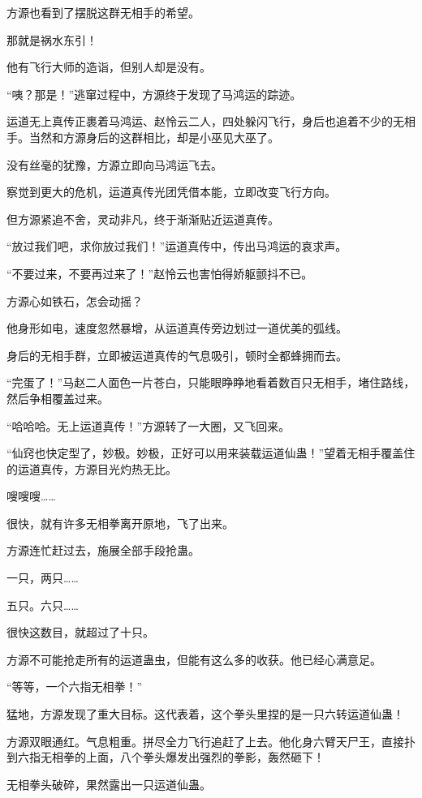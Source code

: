 \begin{this_body}
方源也看到了摆脱这群无相手的希望。

那就是祸水东引！

他有飞行大师的造诣，但别人却是没有。

“咦？那是！”逃窜过程中，方源终于发现了马鸿运的踪迹。

运道无上真传正裹着马鸿运、赵怜云二人，四处躲闪飞行，身后也追着不少的无相手。当然和方源身后的这群相比，却是小巫见大巫了。

没有丝毫的犹豫，方源立即向马鸿运飞去。

察觉到更大的危机，运道真传光团凭借本能，立即改变飞行方向。

但方源紧追不舍，灵动非凡，终于渐渐贴近运道真传。

“放过我们吧，求你放过我们！”运道真传中，传出马鸿运的哀求声。

“不要过来，不要再过来了！”赵怜云也害怕得娇躯颤抖不已。

方源心如铁石，怎会动摇？

他身形如电，速度忽然暴增，从运道真传旁边划过一道优美的弧线。

身后的无相手群，立即被运道真传的气息吸引，顿时全都蜂拥而去。

“完蛋了！”马赵二人面色一片苍白，只能眼睁睁地看着数百只无相手，堵住路线，然后争相覆盖过来。

“哈哈哈。无上运道真传！”方源转了一大圈，又飞回来。

“仙窍也快定型了，妙极。妙极，正好可以用来装载运道仙蛊！”望着无相手覆盖住的运道真传，方源目光灼热无比。

嗖嗖嗖……

很快，就有许多无相拳离开原地，飞了出来。

方源连忙赶过去，施展全部手段抢蛊。

一只，两只……

五只。六只……

很快这数目，就超过了十只。

方源不可能抢走所有的运道蛊虫，但能有这么多的收获。他已经心满意足。

“等等，一个六指无相拳！”

猛地，方源发现了重大目标。这代表着，这个拳头里捏的是一只六转运道仙蛊！

方源双眼通红。气息粗重。拼尽全力飞行追赶了上去。他化身六臂天尸王，直接扑到六指无相拳的上面，八个拳头爆发出强烈的拳影，轰然砸下！

无相拳头破碎，果然露出一只运道仙蛊。


\end{this_body}
